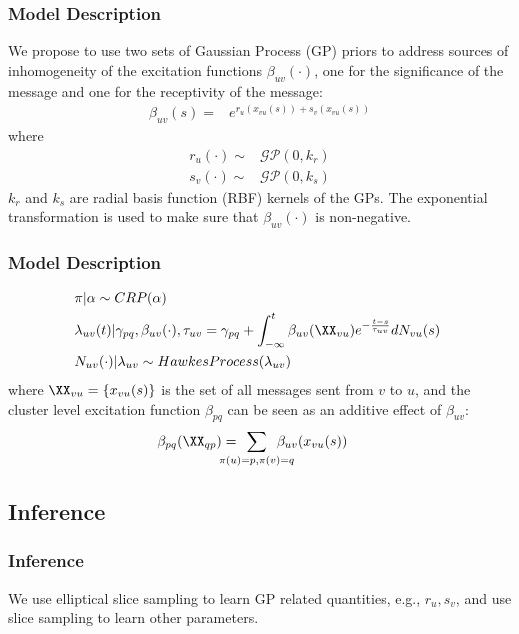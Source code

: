 \documentclass{beamer}
\begin{document}
\begin{frame}
\frametitle{Model Description}
We propose to use two sets of Gaussian Process (GP) priors to address sources of inhomogeneity of the excitation functions $\beta_{uv}(\cdot)$, one for the significance of the message and one for the receptivity of the message:
\begin{align}
\beta_{uv}(s) =& e^{r_{u}(x_{vu}(s)) + s_{v}(x_{vu}(s))}\label{beta}
\end{align}
where
\begin{align}
  r_u(\cdot) \sim & \mathcal{GP}(0, k_r)\\
  s_v(\cdot) \sim & \mathcal{GP}(0, k_s)
\end{align}
$k_r$ and $k_s$ are radial basis function (RBF) kernels of the GPs. The exponential transformation is used to make sure that $\beta_{uv}(\cdot)$ is non-negative.

\end{frame}


\begin{frame}
\frametitle{Model Description}
\fontsize{10pt}{7.2}\selectfont
\begin{alignat}{3}
  &\pi | \alpha \sim CRP(\alpha)\\
  &\lambda_{uv}(t) | \gamma_{pq},\beta_{uv}(\cdot),\tau_{uv} = \gamma_{pq} + \int_{-\infty}^t \beta_{uv}(\XX_{vu}) e^{-\frac{t-s}{\tau_{uv}}} dN_{vu}(s)\hspace{1mm}\\
  &N_{uv}(\cdot) | \lambda_{uv} \sim HawkesProcess(\lambda_{uv})  
\end{alignat}
where $\XX_{vu} = \{x_{vu}(s)\}$ is the set of all messages sent from $v$ to $u$, and the cluster level excitation function $\beta_{pq}$ can be seen as an additive effect of $\beta_{uv}$:
\begin{align}
	\beta_{pq}(\XX_{qp}) =& \hspace{-5mm} \sum\limits_{\pi(u)=p, \pi(v)=q} \hspace{-5mm} \beta_{uv}(x_{vu}(s))
\end{align}

\end{frame}

\subsection{Inference}
\begin{frame}
\frametitle{Inference}
We use elliptical slice sampling to learn GP related quantities, e.g., $r_u, s_v$, and use slice sampling to learn other parameters.
\end{frame}
\end{document}
